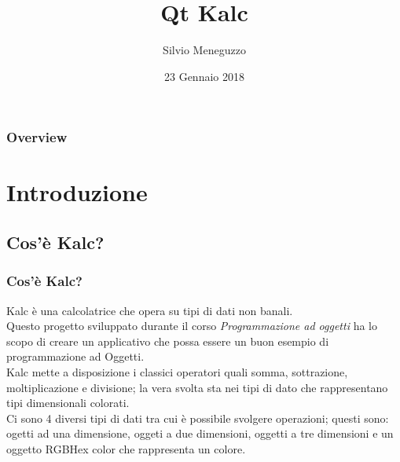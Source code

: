 \documentclass[10pt]{beamer}
\title[Space Kalc]{Qt Kalc} %
\author{Silvio Meneguzzo} %
\institute[Unipd] %
{
Università di Padova - Dipartimento di Matematica \\ %
\medskip
\textit{meneguzzosilvio@gmail.com} %
}
\date{23 Gennaio 2018} %
\begin{document}
\begin{frame}
\titlepage %
\end{frame}

\begin{frame}
\frametitle{Overview} %
\tableofcontents %
\end{frame}


\section{Introduzione} %

\subsection{Cos'è Kalc?} %

\begin{frame}
\frametitle{Cos'è Kalc?}
Kalc è una calcolatrice che opera su tipi di dati non banali. \\
Questo progetto sviluppato durante il corso \textit{Programmazione ad oggetti} ha lo scopo di creare un applicativo che possa essere un buon esempio di programmazione ad Oggetti. \\
Kalc mette a disposizione i classici operatori quali somma, sottrazione, moltiplicazione e divisione; la vera svolta sta nei tipi di dato che rappresentano tipi dimensionali colorati. \\
Ci sono 4 diversi tipi di dati tra cui è possibile svolgere operazioni; questi sono: ogetti ad una dimensione, oggeti a due dimensioni, oggetti a tre dimensioni e un oggetto RGBHex color che rappresenta un colore.



\end{frame}
\end{document}
